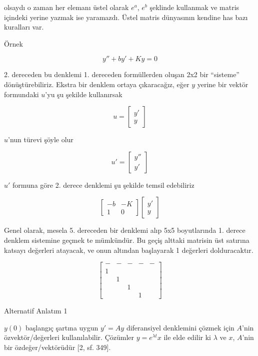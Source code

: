 \documentclass[12pt,fleqn]{article}\usepackage{../../common}
\begin{document}
olsaydı o zaman her elemanı üstel olarak $e^{a}$, $e^b$ şeklinde kullanmak
ve matris içindeki yerine yazmak ise yaramazdı. Üstel matris dünyasının
kendine has bazı kuralları var.

Örnek

$$ y'' + by' + Ky = 0 $$

2. dereceden bu denklemi 1. dereceden formüllerden oluşan 2x2 bir
``sisteme'' dönüştürebiliriz. Ekstra bir denklem ortaya çıkaracağız, eğer
$y$ yerine bir vektör formundaki $u$'yu şu şekilde kullanırsak

$$ u = 
\left[\begin{array}{c}
y' \\ y
\end{array}\right]
 $$

$u$'nun türevi şöyle olur

$$ 
u' = 
\left[\begin{array}{c}
y'' \\ y'
\end{array}\right]
 $$

$u'$ formuna göre 2. derece denklemi şu şekilde temsil edebiliriz

$$ 
\left[\begin{array}{cc}
-b & -K \\
1 & 0
\end{array}\right]
\left[\begin{array}{c}
y' \\ y
\end{array}\right]
 $$

Genel olarak, mesela 5. dereceden bir denklemi alıp 5x5 boyutlarında 1. 
derece denklem sistemine geçmek te mümkündür. Bu geçiş alttaki matrisin 
üst satırına katsayı değerleri atayacak, ve onun altından başlayarak 1 
değerleri dolduracaktır. 

$$ 
\left[\begin{array}{rrrrr}
- & - & - & - & - \\
1 &&&& \\
& 1 &&& \\
&& 1 && \\
&&& 1 & 
\end{array}\right]
 $$

Alternatif Anlatım 1

$y(0)$ başlangıç şartına uygun $y' = Ay$ diferansiyel denklemini çözmek için
$A$'nin özvektör/değerleri kullanılabilir. Çözümler $y = e^{\lambda t} x$ ile
elde edilir ki $\lambda$ ve $x$, $A$'nin bir özdeğer/vektörüdür [2, sf. 349].
\end{document}
